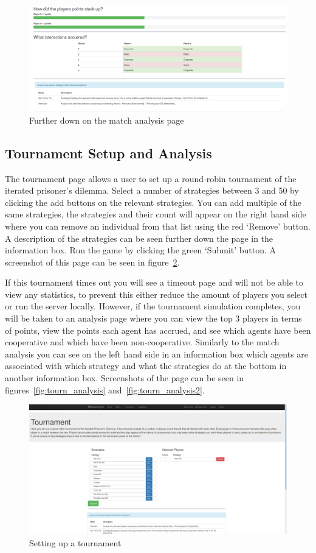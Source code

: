\documentclass[]{final_report}
\begin{document}
\begin{figure}
	\includegraphics[width=\textwidth]{MatchAnalysis.png}
	\caption{Further down on the match analysis page}
	\label{fig:match_analysis}
\end{figure}

\subsection{Tournament Setup and Analysis}
The tournament page allows a user to set up a round-robin tournament of the iterated prisoner's dilemma. Select a number of strategies between 3 and 50 by clicking the add buttons on the relevant strategies. You can add multiple of the same strategies, the strategies and their count will appear on the right hand side where you can remove an individual from that list using the red `Remove' button. A description of the strategies can be seen further down the page in the information box. Run the game by clicking the green `Submit' button. A screenshot of this page can be seen in figure~\ref{fig:tourn_setup}.\par 
If this tournament times out you will see a timeout page and will not be able to view any statistics, to prevent this either reduce the amount of players you select or run the server locally. However, if the tournament simulation completes, you will be taken to an analysis page where you can view the top 3 players in terms of points, view the points each agent has accrued, and see which agents have been cooperative and which have been non-cooperative. Similarly to the match analysis you can see on the left hand side in an information box which agents are associated with which strategy and what the strategies do at the bottom in another information box. Screenshots of the page can be seen in figures~\ref{fig:tourn_analysis} and~\ref{fig:tourn_analysis2}.
\begin{figure}
	\includegraphics[width=\textwidth]{TournSetup.png}
	\caption{Setting up a tournament}
	\label{fig:tourn_setup}
\end{figure}
\end{document}

